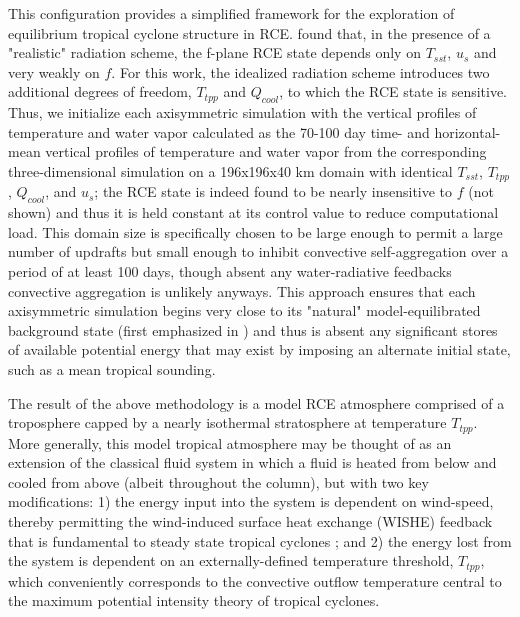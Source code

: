 \documentclass[12pt]{article}
\begin{document}
This configuration provides a simplified framework for the exploration of equilibrium tropical cyclone structure in RCE. \cite{Nolan_Rappin_Emanuel_2007} found that, in the presence of a "realistic" radiation scheme, the f-plane RCE state depends only on $T_{sst}$, $u_s$ and very weakly on $f$. For this work, the idealized radiation scheme introduces two additional degrees of freedom, $T_{tpp}$ and $Q_{cool}$, to which the RCE state is sensitive. Thus, we initialize each axisymmetric simulation with the vertical profiles of temperature and water vapor calculated as the 70-100 day time- and horizontal-mean vertical profiles of temperature and water vapor from the corresponding three-dimensional simulation on a 196x196x40 km domain with identical $T_{sst}$, $T_{tpp}$, $Q_{cool}$, and $u_s$; the RCE state is indeed found to be nearly insensitive to $f$ (not shown) and thus it is held constant at its control value to reduce computational load. This domain size is specifically chosen to be large enough to permit a large number of updrafts but small enough to inhibit convective self-aggregation \citep{Bretherton_Blossey_Khairoutdinov_2005} over a period of at least 100 days, though absent any water-radiative feedbacks convective aggregation is unlikely anyways. This approach ensures that each axisymmetric simulation begins very close to its "natural" model-equilibrated background state (first emphasized in \cite{Rotunno_Emanuel_1987}) and thus is absent any significant stores of available potential energy that may exist by imposing an alternate initial state, such as a mean tropical sounding.

The result of the above methodology is a model RCE atmosphere comprised of a troposphere capped by a nearly isothermal stratosphere at temperature $T_{tpp}$. More generally, this model tropical atmosphere may be thought of as an extension of the classical fluid system in which a fluid is heated from below and cooled from above (albeit throughout the column), but with two key modifications: 1) the energy input into the system is dependent on wind-speed, thereby permitting the wind-induced surface heat exchange (WISHE) feedback that is fundamental to steady state tropical cyclones \citep{Emanuel_1986}; and 2) the energy lost from the system is dependent on an externally-defined temperature threshold, $T_{tpp}$, which conveniently corresponds to the convective outflow temperature central to the maximum potential intensity theory of tropical cyclones.
\end{document}
